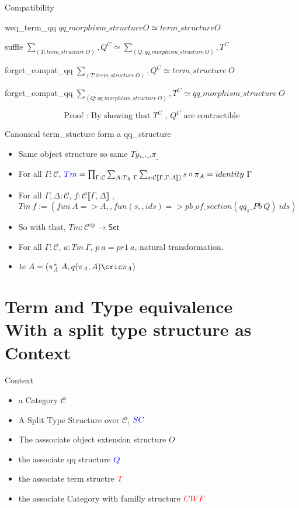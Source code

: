 \documentclass[
  ignorenonframetext,
  aspectratio=169,
  usenames,
  dvipsnames
]{beamer}
\newcommand{\constfont}[1]{\ensuremath{\mathsf{#1}}}
\newcommand{\CC}{{\mathcal{C}}}
\newcommand{\set}{\ensuremath{\constfont{Set}}\xspace}
\newcommand{\compext}[2]{\ensuremath{{#1}.{#2}}}
\newcommand{\deppr}[1]{\constfont{\pi}_{#1}}
\newcommand{\rl}[1]{\color{red}#1\color{black}}
\newcommand{\bl}[1]{\color{blue}#1\color{black}}
\begin{document}
\begin{frame}{Compatibility}
  \begin{block}{weq\_term\_qq}
      $qq\_morphism\_structure O \simeq term\_structure O$
  \end{block}
  \begin{block}{suffle}
    $\sum_{(T : term\_structure\ O)} ,Q^C \simeq \sum_{(Q : qq\_morphism\_structure\ O)} , T^C$
  \end{block}
  \begin{block}{forget\_compat\_qq}
    $\sum_{(T : term\_structure\ O)} , Q^C \simeq  term\_structure\ O$
  \end{block}
  \begin{block}{forget\_compat\_qq}
    $\sum_{(Q : qq\_morphism\_structure\ O)} , T^C \simeq  qq\_morphism\_structure\ O$
  \end{block}
  $$\text{Proof : By showing that $T^C$ , $Q^C$ are contractible}$$
\end{frame}
\begin{frame}{Canonical term\_stucture form a qq\_structure}
 \begin{itemize}
   \item Same object structure so same $Ty$,$\_.\_$,$\pi_{\_}$
   \item For all $\Gamma : \CC$, $\bl{Tm} = \prod_{\Gamma : \CC} \sum_{A : Ty\ \Gamma }\sum_{s:  \CC \llbracket \Gamma,\compext{\Gamma}{A} \rrbracket)} s \circ \deppr{A} = identity\ \Gamma$
   \item For all $\Gamma,\Delta : \CC$, $f : \CC \llbracket \Gamma,\Delta \rrbracket$ , $Tm\ f := (fun\ A => A,, fun (s,,ids) => pb\_of\_section (qq_\pi\_Pb\ Q)\ ids)$
   \item So with that, $Tm : \CC^{op} \rightarrow \set$
   \item For all $\Gamma : \CC$, $a : Tm\ \Gamma$, $p\ a = pr1\ a$, natural transformation.
   \item $te\ A = (\pi_A^*\ A, q(\pi_A,A)\cric \pi_A )$ 
 \end{itemize}
\end{frame}


\section{Term and Type equivalence \\ \small With a split type structure as Context}
\begin{frame}{Context}
  \begin{itemize}
    \item a Category $\CC$
    \item A Split Type Structure over $\CC$, $\bl{SC}$
    \item The asssociate object extension structure $O$
    \item the associate qq structure $\bl{Q}$
    \item the associate term structre $\rl{T}$
    \item the associate Category with familly structure $\rl{CWF}$
  \end{itemize}
\end{frame}
\end{document}
